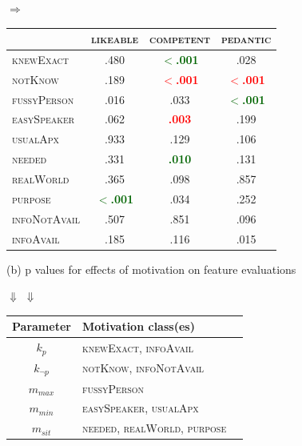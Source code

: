 \documentclass{article}
\newcommand{\xvar}[1]{\textsc{#1}}
\begin{document}
\begin{minipage}{20.0cm}
\begin{minipage}{10.2cm}
{\Large \hspace{-0.1cm }$\Rightarrow$}\hspace{0.5cm }\begin{tabular}{|l|ccc|}
 \hline
 & \xvar{likeable} & \xvar{competent}  & \xvar{pedantic}  \\
 \hline
\xvar{knewExact} &
.480 &
\textcolor{darkgreen}{\textbf{$<$.001}} &
.028  \\
\xvar{notKnow} &
.189 &
\textcolor{red}{\textbf{$<$.001}} &
\textcolor{red}{\textbf{$<$.001}}  \\
\xvar{fussyPerson} &
.016 &
.033 &
\textcolor{darkgreen}{\textbf{$<$.001}}  \\
\xvar{easySpeaker} &
.062 &
\textcolor{red}{\textbf{.003}} &
.199  \\
\xvar{usualApx} &
.933 &
.129 &
.106  \\
\xvar{needed}  &
.331 &
\textcolor{darkgreen}{\textbf{.010}} &
.131  \\
\xvar{realWorld} &
.365 &
.098 &
.857  \\
\xvar{purpose} &
\textcolor{darkgreen}{\textbf{$<$.001}} &
.034 &
.252  \\
\xvar{infoNotAvail} &
.507 &
.851 &
.096  \\
\xvar{infoAvail} &
.185 &
.116 &
.015  \\
 \hline
\end{tabular}

\vspace{.2cm}

\hspace{.85cm}(b) p values for effects of motivation on feature evaluations


\end{minipage}

\vspace{.4cm}
{\Large \hspace{4cm }$\Downarrow$ \hspace{9.6cm }$\Downarrow$}
\vspace{.4cm}

\begin{minipage}{9.0cm}

\renewcommand*{\arraystretch}{1.05}
\hspace{.5cm}\begin{tabular}{|c|p{5.5cm}|c|}
 \hline
Parameter & Motivation class(es)  \\
 \hline
 \hline
$k_{p}$ & \xvar{knewExact},  \xvar{infoAvail}  \\
 \hline
$k_{\neg p}$ & \xvar{notKnow},  \xvar{infoNotAvail}   \\
 \hline
$m_{max}$ & \xvar{fussyPerson} \\
 \hline
$m_{min}$ & \xvar{easySpeaker},  \xvar{usualApx} \\
 \hline
$m_{sit}$ & \xvar{needed},  \xvar{realWorld},  \xvar{purpose} \\
 \hline
\end{tabular}


\end{minipage}
\end{minipage}
\end{document}
